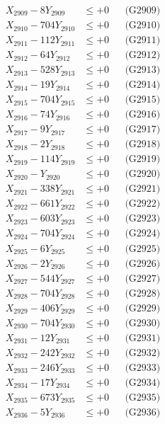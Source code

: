 \documentclass[a4paper,10pt]{article}
\begin{document}
{\begin{align}
X_{2909} - 8Y_{2909} &\leq +0 && \text{(G2909)} \\
X_{2910} - 704Y_{2910} &\leq +0 && \text{(G2910)} \\
\allowbreak
X_{2911} - 112Y_{2911} &\leq +0 && \text{(G2911)} \\
X_{2912} - 64Y_{2912} &\leq +0 && \text{(G2912)} \\
X_{2913} - 528Y_{2913} &\leq +0 && \text{(G2913)} \\
X_{2914} - 19Y_{2914} &\leq +0 && \text{(G2914)} \\
X_{2915} - 704Y_{2915} &\leq +0 && \text{(G2915)} \\
X_{2916} - 74Y_{2916} &\leq +0 && \text{(G2916)} \\
X_{2917} - 9Y_{2917} &\leq +0 && \text{(G2917)} \\
X_{2918} - 2Y_{2918} &\leq +0 && \text{(G2918)} \\
X_{2919} - 114Y_{2919} &\leq +0 && \text{(G2919)} \\
X_{2920} - Y_{2920} &\leq +0 && \text{(G2920)} \\
\allowbreak
X_{2921} - 338Y_{2921} &\leq +0 && \text{(G2921)} \\
X_{2922} - 661Y_{2922} &\leq +0 && \text{(G2922)} \\
X_{2923} - 603Y_{2923} &\leq +0 && \text{(G2923)} \\
X_{2924} - 704Y_{2924} &\leq +0 && \text{(G2924)} \\
X_{2925} - 6Y_{2925} &\leq +0 && \text{(G2925)} \\
X_{2926} - 2Y_{2926} &\leq +0 && \text{(G2926)} \\
X_{2927} - 544Y_{2927} &\leq +0 && \text{(G2927)} \\
X_{2928} - 704Y_{2928} &\leq +0 && \text{(G2928)} \\
X_{2929} - 406Y_{2929} &\leq +0 && \text{(G2929)} \\
X_{2930} - 704Y_{2930} &\leq +0 && \text{(G2930)} \\
\allowbreak
X_{2931} - 12Y_{2931} &\leq +0 && \text{(G2931)} \\
X_{2932} - 242Y_{2932} &\leq +0 && \text{(G2932)} \\
X_{2933} - 246Y_{2933} &\leq +0 && \text{(G2933)} \\
X_{2934} - 17Y_{2934} &\leq +0 && \text{(G2934)} \\
X_{2935} - 673Y_{2935} &\leq +0 && \text{(G2935)} \\
X_{2936} - 5Y_{2936} &\leq +0 && \text{(G2936)} \\

\end{align}}
\end{document}
